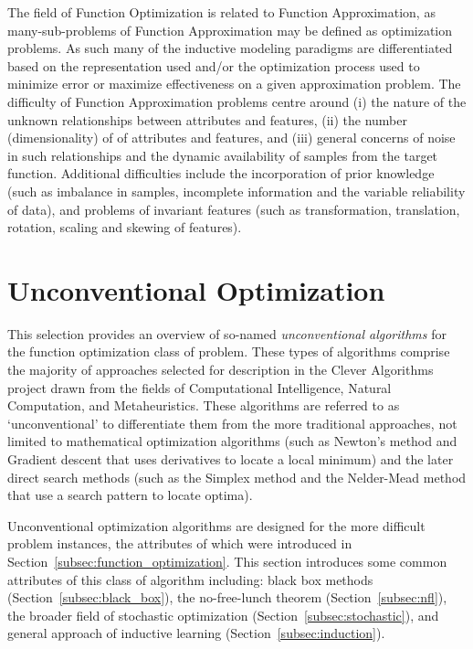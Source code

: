 \documentclass[a4paper, 11pt]{article}
\begin{document}
The field of Function Optimization is related to Function Approximation, as many-sub-problems of Function Approximation may be defined as optimization problems. As such many of the inductive modeling paradigms are differentiated based on the representation used and/or the optimization process used to minimize error or maximize effectiveness on a given approximation problem. 
The difficulty of Function Approximation problems centre around (i) the nature of the unknown relationships between attributes and features, (ii) the number (dimensionality) of of attributes and features, and (iii) general concerns of noise in such relationships and the dynamic availability of samples from the target function.
Additional difficulties include the incorporation of prior knowledge (such as imbalance in samples, incomplete information and the variable reliability of data), and problems of invariant features (such as transformation, translation, rotation, scaling and skewing of features).


% 
% 
\section{Unconventional Optimization}
\label{sec:unconventional_optimization}
This selection provides an overview of so-named \emph{unconventional algorithms} for the function optimization class of problem. These types of algorithms comprise the majority of approaches selected for description in the Clever Algorithms project drawn from the fields of Computational Intelligence, Natural Computation, and Metaheuristics. 
These algorithms are referred to as `unconventional' to differentiate them from the more traditional approaches, not limited to mathematical optimization algorithms (such as Newton's method and Gradient descent that uses derivatives to locate a local minimum) and the later direct search methods (such as the Simplex method and the Nelder-Mead method that use a search pattern to locate optima).

Unconventional optimization algorithms are designed for the more difficult problem instances, the attributes of which were introduced in Section~\ref{subsec:function_optimization}. This section introduces some common attributes of this class of algorithm including: black box methods (Section~\ref{subsec:black_box}), the no-free-lunch theorem (Section~\ref{subsec:nfl}), the broader field of stochastic optimization (Section~\ref{subsec:stochastic}), and general approach of inductive learning (Section~\ref{subsec:induction}).
\end{document}
